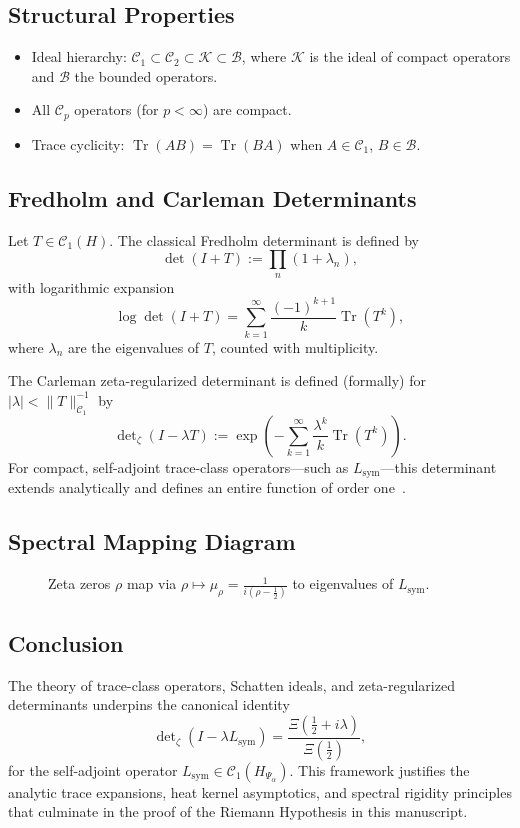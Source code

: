 \subsection*{Structural Properties}

\begin{itemize}
  \item Ideal hierarchy: \( \mathcal{C}_1 \subset \mathcal{C}_2 \subset \mathcal{K} \subset \mathcal{B} \), where \( \mathcal{K} \) is the ideal of compact operators and \( \mathcal{B} \) the bounded operators.
  \item All \( \mathcal{C}_p \) operators (for \( p < \infty \)) are compact.
  \item Trace cyclicity: \( \operatorname{Tr}(AB) = \operatorname{Tr}(BA) \) when \( A \in \mathcal{C}_1 \), \( B \in \mathcal{B} \).
\end{itemize}

\subsection*{Fredholm and Carleman Determinants}

Let \( T \in \mathcal{C}_1(H) \). The classical Fredholm determinant is defined by
\[
\det(I + T) := \prod_n (1 + \lambda_n),
\]
with logarithmic expansion
\[
\log \det(I + T) = \sum_{k=1}^\infty \frac{(-1)^{k+1}}{k} \operatorname{Tr}(T^k),
\]
where \( \lambda_n \) are the eigenvalues of \( T \), counted with multiplicity.

The Carleman zeta-regularized determinant is defined (formally) for \( |\lambda| < \|T\|_{\mathcal{C}_1}^{-1} \) by
\[
\det\nolimits_\zeta(I - \lambda T) := \exp\left( -\sum_{k=1}^\infty \frac{\lambda^k}{k} \operatorname{Tr}(T^k) \right).
\]
For compact, self-adjoint trace-class operators—such as \( L_{\mathrm{sym}} \)—this determinant extends analytically and defines an entire function of order one~\cite{Simon2005TraceIdeals}.

\subsection*{Spectral Mapping Diagram}

\begin{figure}[ht]
\centering
\caption{Zeta zeros \( \rho \) map via \( \rho \mapsto \mu_\rho = \frac{1}{i(\rho - \tfrac{1}{2})} \) to eigenvalues of \( L_{\mathrm{sym}} \).}
\label{fig:spectral-mapping}
\end{figure}

\subsection*{Conclusion}

The theory of trace-class operators, Schatten ideals, and zeta-regularized determinants underpins the canonical identity
\[
\det\nolimits_\zeta(I - \lambda L_{\mathrm{sym}}) = \frac{\Xi(\tfrac{1}{2} + i\lambda)}{\Xi(\tfrac{1}{2})},
\]
for the self-adjoint operator \( L_{\mathrm{sym}} \in \mathcal{C}_1(H_{\Psi_\alpha}) \). This framework justifies the analytic trace expansions, heat kernel asymptotics, and spectral rigidity principles that culminate in the proof of the Riemann Hypothesis in this manuscript.
